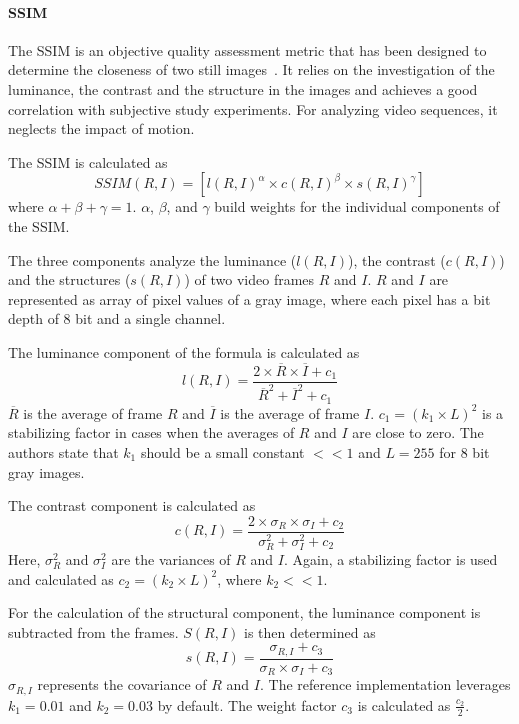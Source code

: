 \paragraph{SSIM}
The \acf{SSIM} is an objective quality assessment metric that has been designed to determine the closeness of two still images~\cite{Wang2004}.
It relies on the investigation of the luminance, the contrast and the structure in the images and achieves a good correlation with subjective study experiments.
For analyzing video sequences, it neglects the impact of motion.

The \ac{SSIM} is calculated as
\begin{equation}
SSIM(R,I) = \left[l(R,I)^\alpha \times c(R,I)^\beta \times s(R,I)^\gamma \right]
\end{equation} 
where $\alpha + \beta + \gamma = 1$. 
$\alpha$, $\beta$, and $\gamma$ build weights for the individual components of the \ac{SSIM}.

The three components analyze the luminance ($l(R,I)$), the contrast ($c(R,I)$) and the structures ($s(R,I)$) of two video frames $R$ and $I$.
$R$ and $I$ are represented as array of pixel values of a gray image, where each pixel has a bit depth of 8 bit and a single channel.

The luminance component of the formula is calculated as
\begin{equation}
l(R,I)=\frac{2 \times \overline{R}  \times \overline{I} + c_1}{\overline{R}^2 + \overline{I}^2 + c_1}
\end{equation}
$\overline{R}$ is the average of frame $R$ and $\overline{I}$ is the average of frame $I$.
$c_1 = (k_1 \times L)^2$ is a stabilizing factor in cases when the averages of $R$ and $I$ are close to zero.
The authors state that $k_1$ should be a small constant $<<1$ and $L=255$ for 8 bit gray images. 

The contrast component is calculated as
\begin{equation}
c(R,I)=\frac{2 \times \sigma_R  \times \sigma_{I} + c_2}{\sigma^2_{R} + \sigma^2_{I} + c_2}
\end{equation}
Here, $\sigma_R^2$ and  $\sigma_I^2$ are the variances of $R$ and $I$.
Again, a stabilizing factor is used and calculated as $c_2 = (k_2 \times L)^2$, where $k_2 << 1$.

For the calculation of the structural component, the luminance component is subtracted from the frames.
$S(R,I)$ is then determined as
\begin{equation}
s(R,I)=\frac{\sigma_{R,I} + c_3}{\sigma_R \times \sigma_{I} + c_3}
\end{equation}
$\sigma_{R,I}$ represents the covariance of $R$ and $I$.
The reference implementation leverages $k_1 = 0.01$ and $k_2 = 0.03$ by default.
The weight factor $c_3$ is calculated as $\frac{c_2}{2}$.

